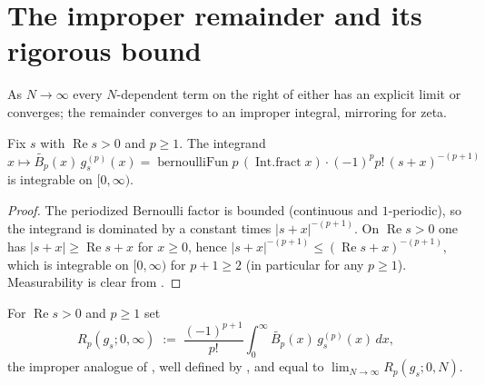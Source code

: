 \section{The improper remainder and its rigorous bound}
\label{sec:gs_remainder}

As $N\to\infty$ every $N$-dependent term on the right of 
either has an explicit limit or converges; the remainder converges to an improper
integral, mirroring  for zeta.

\begin{lemma}
\label{lem:gs_remainder_integrable}
\leanok
{}
Fix $s$ with $\operatorname{Re}s>0$ and $p\ge1$. The integrand
$x\mapsto \widetilde{B_p}(x)\,g_s^{(p)}(x)
 = \operatorname{bernoulliFun}p\,(\operatorname{Int.fract}x)\cdot(-1)^pp!\,(s+x)^{-(p+1)}$
is integrable on $[0,\infty)$.
\end{lemma}

\begin{proof}
\leanok
{}
The periodized Bernoulli factor is bounded (continuous and $1$-periodic), so the
integrand is dominated by a constant times $|s+x|^{-(p+1)}$. On
$\operatorname{Re}s>0$ one has $|s+x|\ge\operatorname{Re}s+x$ for $x\ge0$, hence
$|s+x|^{-(p+1)}\le(\operatorname{Re}s+x)^{-(p+1)}$, which is integrable on
$[0,\infty)$ for $p+1\ge2$ (in particular for any $p\ge1$). Measurability is clear
from .
\end{proof}

\begin{definition}
\label{def:gs_remainder_Ioi}
\leanok
{}
For $\operatorname{Re}s>0$ and $p\ge1$ set
\[
  R_p(g_s;0,\infty) \;:=\; \frac{(-1)^{p+1}}{p!}\int_0^{\infty}
     \widetilde{B_p}(x)\,g_s^{(p)}(x)\,dx ,
\]
the improper analogue of , well defined by
, and equal to $\lim_{N\to\infty}R_p(g_s;0,N)$.
\end{definition}

